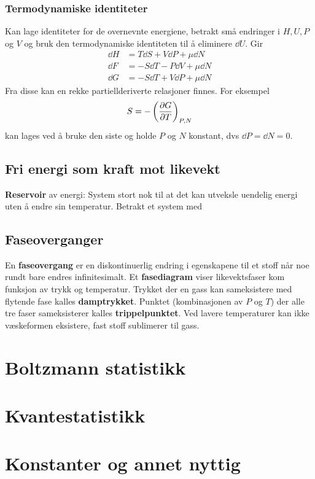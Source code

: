 \documentclass[12pt]{article}
\begin{document}
\subsubsection{Termodynamiske identiteter}
Kan lage identiteter for de overnevnte energiene, betrakt små endringer i $H, U, P$ og $V$
og bruk den termodynamiske identiteten til å eliminere $\dd U$. Gir
\begin{align*}
  \dd H &= T \dd S + V \dd P + \mu \dd N \\
  \dd F &= -S \dd T - P \dd V + \mu \dd N \\
  \dd G &= -S \dd T + V \dd P + \mu \dd N
\end{align*}
Fra disse kan en rekke partiellderiverte relasjoner finnes. For eksempel
\begin{align*}
  S = -\left( \pdv{G}{T} \right)_{P,N}
\end{align*}
kan lages ved å bruke den siste og holde $P$ og $N$ konstant, dvs $\dd P = \dd N = 0$.
\subsection{Fri energi som kraft mot likevekt}
\textbf{Reservoir} av energi: System stort nok til at det kan utveksle uendelig
energi uten å endre sin temperatur. \newline \noindent
Betrakt et system med
\subsection{Faseoverganger}
En \textbf{faseovergang} er en diskontinuerlig endring i egenskapene til et stoff
når noe rundt bare endres infinitesimalt. Et \textbf{fasediagram} viser likevektsfaser
kom funksjon av trykk og temperatur. Trykket der en gass kan sameksistere med flytende
fase kalles \textbf{damptrykket}. Punktet (kombinasjonen av $P$ og $T$) der
alle tre faser sameksisterer kalles \textbf{trippelpunktet}. Ved lavere temperaturer
kan ikke væskeformen eksistere, fast stoff sublimerer til gass.
\section{Boltzmann statistikk}

\section{Kvantestatistikk}

\section{Konstanter og annet nyttig}
\end{document}

